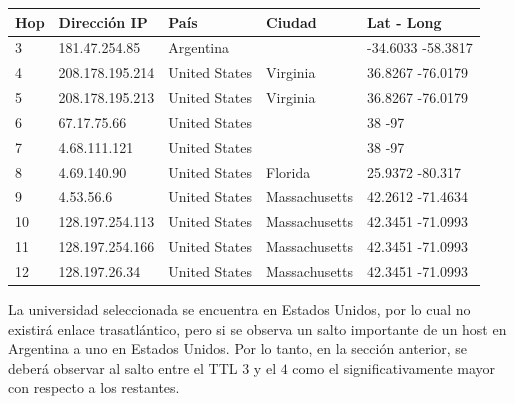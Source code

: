 \begin{center}
 \begin{tabular}{|l|l|l|l|l|}
    \hline
    Hop &Dirección IP &País &Ciudad &Lat - Long \\ \hline \hline
    3 & 181.47.254.85 & Argentina  &  & -34.6033 -58.3817 \\ \hline
    4 & 208.178.195.214 & United States & Virginia  & 36.8267 -76.0179 \\ \hline
    5 & 208.178.195.213 & United States & Virginia  & 36.8267 -76.0179 \\ \hline
    6 & 67.17.75.66 & United States  &  & 38 -97 \\ \hline
    7 & 4.68.111.121 & United States  &  & 38 -97 \\ \hline
    8 & 4.69.140.90 & United States & Florida  & 25.9372 -80.317 \\ \hline
    9 & 4.53.56.6 & United States & Massachusetts  & 42.2612 -71.4634 \\ \hline
    10 & 128.197.254.113 & United States & Massachusetts  & 42.3451 -71.0993 \\ \hline
    11 & 128.197.254.166 & United States & Massachusetts  & 42.3451 -71.0993 \\ \hline
    12 & 128.197.26.34 & United States & Massachusetts  & 42.3451 -71.0993 \\ \hline
 \end{tabular}
\end{center}

La universidad seleccionada se encuentra en Estados Unidos, por lo cual no existirá enlace trasatlántico, pero si se observa un salto importante de un host en Argentina a uno en Estados Unidos. Por lo tanto, en la sección anterior, se deberá observar al salto entre el TTL $3$ y el $4$ como el significativamente mayor con respecto a los restantes. 

